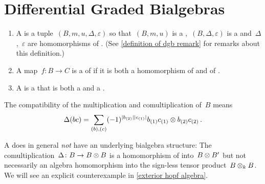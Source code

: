 \documentclass[a4paper,10pt,headings=standardclasses]{scrartcl}
\begin{document}
\section{Differential Graded Bialgebras}

\begin{definition}
  \label{definition of dgb}
  \leavevmode
  \begin{enumerate}
    \item
      A  is a tuple~$(B, m, u, \Delta, \varepsilon)$ so that~$(B, m, u)$ is a {\dga},~$(B, \Delta, \varepsilon)$ is a {\dgc} and~$\Delta$,~$\varepsilon$ are homomorphisms of {\dgas}.
      (See \cref{definition of dgb remark} for remarks about this definition.)
    \item
      A map~$f \colon B \to C$ is a  of {\dgbs} if it is both a homomorphism of {\dgas} and of {\dgcs}.
    \item
      A  is a {\dgsub} that is both a {\dgi} and a {\dgci}.
  \end{enumerate}
\end{definition}

\begin{remark}
  The compatibility of the multiplication and comultiplication of~$B$ means
  \begin{gather*}
    \Delta(bc)
    =
    \sum_{(b), (c)}
    (-1)^{\lvert b_{(2)}\rvert \lvert c_{(1)}\rvert}
    b_{(1)} c_{(1)} \otimes b_{(2)} c_{(2)} \,.
  \end{gather*}
\end{remark}


\begin{warning}
  A {\dgb} does in general \emph{not} have an underlying bialgebra structure:
  The comultiplication~$\Delta \colon B \to B \otimes B$ is a homomorphism of {\dgas} into~$B \otimes B'$ but not necessarily an algebra homomorphism into the sign-less tensor product~$B \otimes_k B$.
  We will see an explicit counterexample in \cref{exterior hopf algebra}.
\end{warning}
\end{document}
